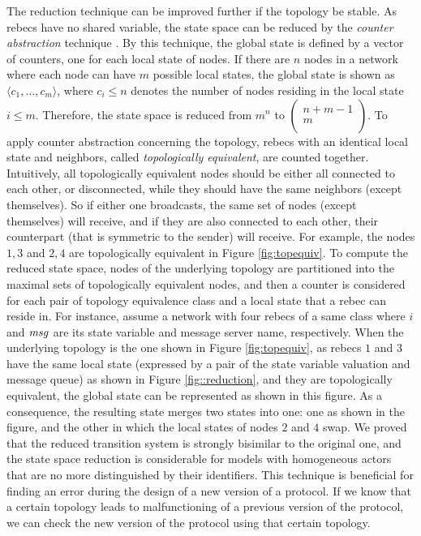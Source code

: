 The reduction technique can be improved further if the topology be stable. As rebecs have no shared variable, the state space %
can be reduced by the \emph{counter abstraction} technique \cite{emerson1999asymmetry}. By this technique, the global state is defined by a vector of counters, one for each local state of nodes. If there are $n$ nodes in a network where each node can have $m$ possible local states, the global state is shown as $\langle c_1,\ldots,c_m \rangle $, where $c_i\le n$ denotes the number of nodes residing in the local state $i\le m$. Therefore, the state space is reduced from $m^n$ to $\begin{pmatrix}
n+m-1 \\
m \\
\end{pmatrix}$. To apply
counter abstraction concerning the topology, rebecs with an identical local state and
neighbors, called \textit{topologically equivalent},  are counted together. Intuitively, all topologically equivalent nodes should be either all connected to each other, or disconnected, while they should have the same neighbors (except themselves). So if either one broadcasts, the same set of nodes (except themselves) will receive, and if they are also connected to each other, their counterpart (that is symmetric to the sender) will receive. For example, the nodes $1,3$ and $2,4$ are topologically equivalent in Figure \ref{fig:topequiv}. To compute the reduced state space, nodes of the underlying topology are partitioned into the maximal sets of topologically equivalent nodes, and then a counter is considered for each pair of topology equivalence class and a local state that a rebec can reside in. For instance, assume a network with four rebecs of a same class where $i$ and ${\it msg}$ are its state variable and message server name, respectively. When the underlying topology is the one shown in Figure \ref{fig:topequiv}, as rebecs $1$ and $3$ have the same local state (expressed by a pair of the state variable valuation and message queue) as shown in Figure \ref{fig::reduction}, and they are topologically equivalent, the global state can be represented as shown in this figure. As a consequence, the resulting state merges two states into one: one as shown in the figure, and the other in which the local states of nodes $2$ and $4$ swap. We proved that the reduced transition system is strongly bisimilar to
the original one, and the state space reduction is considerable for models with homogeneous  actors that are no more distinguished by their identifiers. This technique is
beneficial for finding an error during the design of a new version of a protocol.
If we know that a certain topology leads to malfunctioning of a previous version of the protocol, we can check the new version of the protocol using that certain topology.

